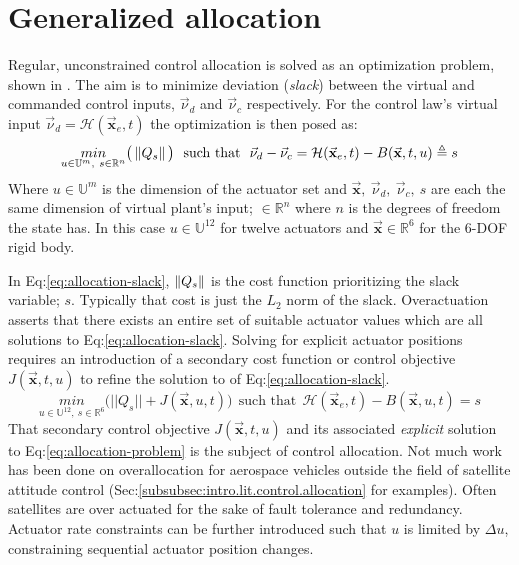 \section{Generalized allocation}
\label{sec:allocation.slack}
Regular, unconstrained control allocation is solved as an optimization problem, shown in \cite{allocation,controlallocation}. The aim is to minimize deviation (\emph{slack}) between the virtual and commanded control inputs, $\vec{\nu}_d$ and $\vec{\nu}_c$ respectively. For the control law's virtual input $\vec{\nu}_d=\mathcal{H}(\vec{\mathbf{x}}_e,t)$ the optimization is then posed as:
\begin{equation}\label{eq:allocation-slack}
\underset{u\in\mathbb{U}^{m},~s\in\mathbb{R}^{n}}{min}\big(\left\lVert Q_s\right\rVert\big)~~\text{such that}~~\vec{\nu}_d-\vec{\nu}_c=\mathcal{H}(\vec{\mathbf{x}}_e,t)-B(\vec{\mathbf{x}},t,u)\triangleq s
\end{equation}
Where $u\in\mathbb{U}^m$ is the dimension of the actuator set and $\vec{\mathbf{x}},~\vec{\nu}_d,~\vec{\nu}_c,~s$ are each the same dimension of virtual plant's input; $\in\mathbb{R}^{n}$ where $n$ is the degrees of freedom the state has. In this case $u\in\mathbb{U}^{12}$ for twelve actuators and $\vec{\mathbf{x}}\in\mathbb{R}^6$ for the 6-DOF rigid body.
\par
In Eq:\ref{eq:allocation-slack}, $\left\lVert Q_s\right\rVert$ is the cost function prioritizing the slack variable; $s$. Typically that cost is just the $L_2$ norm of the slack. Overactuation asserts that there exists an entire set of suitable actuator values which are all solutions to Eq:\ref{eq:allocation-slack}. Solving for explicit actuator positions requires an introduction of a secondary cost function or control objective $J(\vec{\mathbf{x}},t,u)$ to refine the solution to of Eq:\ref{eq:allocation-slack}.
\begin{equation}\label{eq:allocation-problem}
\underset{u\in\mathbb{U}^{12},~s\in\mathbb{R}^{6}}{min}\big(||Q_s||+J(\vec{\mathbf{x}},u,t)\big)~~\text{such that}~~\mathcal{H}(\vec{\mathbf{x}}_e,t)-B(\vec{\mathbf{x}},u,t)=s
\end{equation}
That secondary control objective $J(\vec{\mathbf{x}},t,u)$ and its associated \emph{explicit} solution to Eq:\ref{eq:allocation-problem} is the subject of control allocation. Not much work has been done on overallocation for aerospace vehicles outside the field of satellite attitude control (Sec:\ref{subsubsec:intro.lit.control.allocation} for examples). Often satellites are over actuated for the sake of fault tolerance and redundancy\cite{FTCallocation,discreteFTC}. Actuator rate constraints can be further introduced such that $u$ is limited by $\Delta u$, constraining sequential actuator position changes.
